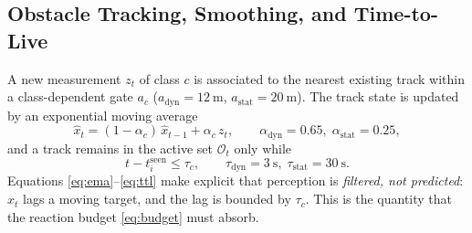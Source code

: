 \subsection{Obstacle Tracking, Smoothing, and Time-to-Live}
A new measurement $z_t$ of class $c$ is associated to the nearest existing
track within a class-dependent gate $a_c$ ($a_{\text{dyn}}=\SI{12}{\meter}$,
$a_{\text{stat}}=\SI{20}{\meter}$). The track state is updated by an
exponential moving average
\begin{equation}
\hat{x}_t=(1-\alpha_c)\,\hat{x}_{t-1}+\alpha_c\,z_t,
\qquad \alpha_{\text{dyn}}=0.65,\;\alpha_{\text{stat}}=0.25,
\label{eq:ema}
\end{equation}
and a track remains in the active set $\mathcal{O}_t$ only while
\begin{equation}
t-t^{\text{seen}}_i\le \tau_c,
\qquad \tau_{\text{dyn}}=\SI{3}{\second},\;\tau_{\text{stat}}=\SI{30}{\second}.
\label{eq:ttl}
\end{equation}
Equations \eqref{eq:ema}--\eqref{eq:ttl} make explicit that perception is
\emph{filtered, not predicted}: $\hat{x}_t$ lags a moving target, and the lag
is bounded by $\tau_c$. This is the quantity that the reaction budget
\eqref{eq:budget} must absorb.

